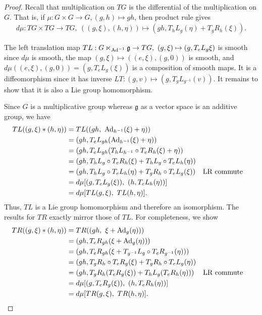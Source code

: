 \documentclass[12pt,class=article,crop=false]{standalone}
\begin{document}
\begin{proof}
Recall that multiplication on $ TG$ is the differential of the multiplication on $ G$. That is, if $ \mu: G \times G \to G, (g,h) \mapsto gh$, then product rule gives
\begin{align*}
	d\mu : TG \times TG \to TG,\ ((g, \xi) , (h, \eta)) \mapsto (gh, T_hL_g (\eta) + T_g R_h (\xi)).
\end{align*}

The left translation map $ TL: G\ltimes_{ \operatorname{Ad}^{-1}} \mathfrak{ g} \to TG,\ (g,\xi) \mapsto (g,T_eL_g \xi)$ is smooth since $d\mu$ is smooth, the map $(g,\xi) \mapsto  ((e,\xi),(g,0))$ is smooth, and $ d\mu ((e,\xi),(g,0)) = (g, T_eL_g(\xi) )$ is a composition of smooth maps. It is a diffeomorphism since it has inverse $LT: (g, v) \mapsto (g,T_g L_{g^{-1}}(v))$. It remains to show that it is also a Lie group homomorphism.

Since $G$ is a multiplicative group whereas $\mathfrak{g}$ as a vector space is an additive group, we have
\begin{align*}
    TL((g,\xi)*(h,\eta)) &= TL((gh,\ \operatorname{Ad}_{h^{-1}}(\xi) + \eta))\\
    &=(gh, T_e L_{gh}( \operatorname{Ad}_{ h^{-1}}( \xi) + \eta))\\
    &= (gh, T_e L_{gh} ( T_{h}L_{h^{-1}} \circ T_e R_{h} (\xi) + \eta))\\
    &= (gh, T_h L_g \circ T_eR_h(\xi) + T_hL_g \circ T_eL_h(\eta) )\\
    &= (gh, T_hL_g \circ T_eL_h(\eta) + T_gR_h \circ T_eL_g(\xi)) && \text{LR commute}  \\
    &= d\mu [(g, T_e L_g(\xi)) ,\ (h,T_eL_h (\eta)) ]\\
    &= d\mu [TL(g,\xi) ,\ TL(h,\eta)].
\end{align*}
Thus, $TL$ is a Lie group homomorphism and therefore an isomorphism. The results for $TR$ exactly mirror those of $ TL$. For completeness, we show
\begin{align*}
    TR((g,\xi)*(h,\eta)) &= TR((gh,\ \xi + \operatorname{Ad}_g(\eta)))\\
    &=(gh, T_e R_{gh}(\xi + \operatorname{Ad}_g(\eta)))\\
    &= (gh, T_e R_{gh} (\xi+ T_{g^{-1}}L_g \circ T_e R_{g^{-1}} (\eta)))\\
    &= (gh, T_gR_h \circ T_e R_g(\xi) + T_gR_h \circ T_eL_g(\eta))\\
    &= (gh, T_gR_h ( T_eR_g(\xi)) + T_hL_g (T_eR_h (\eta))) &&\text{LR commute} \\
    &= d\mu [(g, T_e R_g(\xi)) ,\ (h,T_eR_h (\eta)) ]\\
    &= d\mu [TR(g,\xi) ,\ TR(h,\eta)].
\end{align*}
\end{proof}
\end{document}
